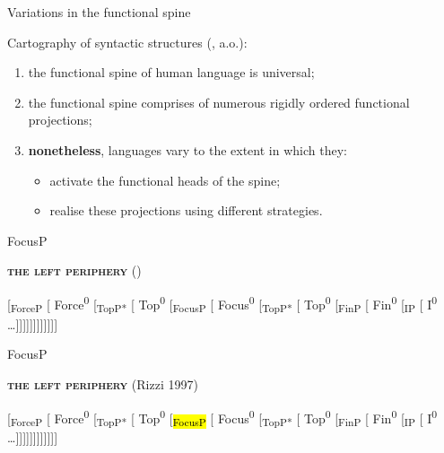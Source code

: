 \documentclass[lesson_slides]{subfiles}
\begin{document}
\begin{frame}[c]{Variations in the functional spine}

    \noindent Cartography of syntactic structures (\cite{cinquerizzi2010,rizzicinque2016}, a.o.): \pause
    \begin{enumerate}
        \item the functional spine of human language is universal; \pause
        \item the functional spine comprises of numerous rigidly ordered functional projections; \pause
        \item \textbf{nonetheless}, languages vary to the extent in which they: \pause
            \begin{itemize}
                \item[\ding{227}] activate the functional heads of the spine; \pause
                \item[\ding{227}] realise these projections using different strategies. 
            \end{itemize}
    \end{enumerate}

\end{frame}
    \begin{frame}[c]{FocusP}
    
    \textbf{\textsc{the left periphery}} (\cite{rizzi1997fine})
    
    [\textsubscript{ForceP} [ Force\textsuperscript{0} [\textsubscript{TopP*} [ Top\textsuperscript{0} [\textsubscript{FocusP} [ Focus\textsuperscript{0} [\textsubscript{TopP*} [ Top\textsuperscript{0} [\textsubscript{FinP} [ Fin\textsuperscript{0} [\textsubscript{IP} [ I\textsuperscript{0} \dots ]]]]]]]]]]]]
      
    \end{frame}
\begin{frame}[c]{FocusP}

\textbf{\textsc{the left periphery}} (Rizzi 1997)

[\textsubscript{ForceP} [ Force\textsuperscript{0} [\textsubscript{TopP*} [ Top\textsuperscript{0} [\textsubscript{\hl{FocusP}} [ Focus\textsuperscript{0} [\textsubscript{TopP*} [ Top\textsuperscript{0} [\textsubscript{FinP} [ Fin\textsuperscript{0} [\textsubscript{IP} [ I\textsuperscript{0} \dots ]]]]]]]]]]]]


  
\end{frame}
\end{document}
